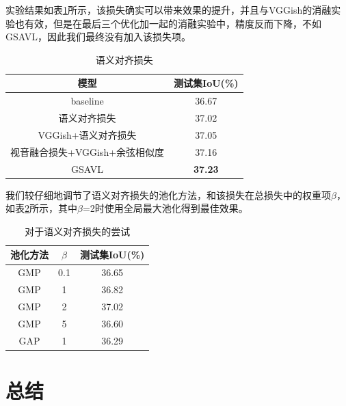 \documentclass[12pt]{article}
\begin{document}
实验结果如表\ref{tab:my_label}所示，该损失确实可以带来效果的提升，并且与VGGish的消融实验也有效，但是在最后三个优化加一起的消融实验中，精度反而下降，不如GSAVL，因此我们最终没有加入该损失项。

\begin{table}[H]
    \centering
    \begin{tabular}{|c|c|}
    \hline
         模型 &  测试集IoU(\%) \\ \hline
        baseline &  36.67 \\ \hline
        语义对齐损失&37.02\\\hline
        VGGish+语义对齐损失&37.05\\\hline
        视音融合损失+VGGish+余弦相似度&37.16\\\hline
        GSAVL&\textbf{37.23}\\\hline
    \end{tabular}
    \caption{语义对齐损失}
    \label{tab:my_label}
\end{table}
我们较仔细地调节了语义对齐损失的池化方法，和该损失在总损失中的权重项$\beta$，如表\ref{figure:aligh}所示，其中$\beta$=2时使用全局最大池化得到最佳效果。
\begin{table}[H]
    \centering
    \begin{tabular}{|c|c|c|}
    \hline
         池化方法&$\beta$ &  测试集IoU(\%) \\ \hline
        GMP &0.1&  36.65 \\ \hline
        GMP &1&  36.82 \\ \hline
        GMP &2&  37.02 \\ \hline
        GMP &5&  36.60 \\ \hline
        GAP &1&  36.29 \\ \hline
    \end{tabular}
    \caption{对于语义对齐损失的尝试}
    \label{figure:aligh}
\end{table}
\section{总结}
\end{document}
